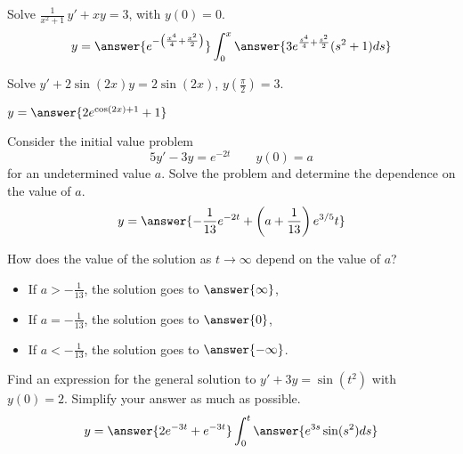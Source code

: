 \documentclass{ximera}
\begin{document}
\begin{exercise}
    Solve $\frac{1}{x^2+1} \, y' + x y = 3$, with $y(0) = 0$.
    \[
        y = \answer{ e^{-\left(\frac{x^4}{4} + \frac{x^2}{2}\right)}} \int_0^x \answer{3e^{\frac{s^4}{4} + \frac{s^2}{2}}(s^2 + 1) ds}
    \]
\end{exercise}

\begin{exercise}%
    Solve $y'+ 2\sin(2x) y = 2\sin(2x)$, $y(\frac{\pi}{2}) = 3$.
    
    $y = \answer{ 2 e^{\cos(2x)+1} + 1}$
\end{exercise}

\begin{exercise}
    Consider the initial value problem
    \[ 
        5y' - 3y = e^{-2t} \qquad y(0) = a 
    \] 
    for an undetermined value $a$. Solve the problem and determine the dependence on the value of $a$. 
    \[
        y = \answer{ -\frac{1}{13}e^{-2t} + \left(a + \frac{1}{13}\right)e^{3/5}t}
    \]
    \begin{problem}
        How does the value of the solution as $t \rightarrow \infty$ depend on the value of $a$?
        \begin{itemize}
            \item If $a > -\frac{1}{13}$, the solution goes to $\answer{\infty}$, 
            \item If $a = -\frac{1}{13}$, the solution goes to $\answer{0}$, 
            \item If $a < -\frac{1}{13}$, the solution goes to $\answer{-\infty}$.
        \end{itemize}
    \end{problem}
\end{exercise}

\begin{exercise}
    Find an expression for the general solution to $y' + 3y = \sin(t^2)$ with $y(0) = 2$. Simplify your answer as much as possible.
    \[
        y = \answer{ 2e^{-3t} + e^{-3t}}\int_0^t \answer{e^{3s}\sin(s^2) ds}
    \]
\end{exercise}

\end{document}
